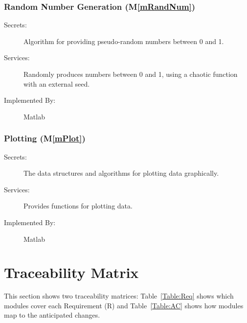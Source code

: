 \documentclass[12pt, titlepage]{article}
\newcommand{\mref}[1]{M\ref{#1}}
\begin{document}
\subsubsection{Random Number Generation (\mref{mRandNum})}

\begin{description}
\item[Secrets:] Algorithm for providing pseudo-random numbers between 0 and 1.
\item[Services:] Randomly produces numbers between 0 and 1, using a
  chaotic function with an external seed.
\item[Implemented By:] Matlab
\end{description}


\subsubsection{Plotting (\mref{mPlot})}

\begin{description}
\item[Secrets:] The data structures and algorithms for plotting data
  graphically.
\item[Services:] Provides functions for plotting data.
\item[Implemented By:] Matlab
\end{description}

\section{Traceability Matrix} \label{SecTM}

\hspace{3ex}This section shows two traceability matrices: Table~\ref{Table:Req} 
shows which modules cover each Requirement (R) and Table~\ref{Table:AC} shows 
how modules map to the anticipated changes.
\end{document}
